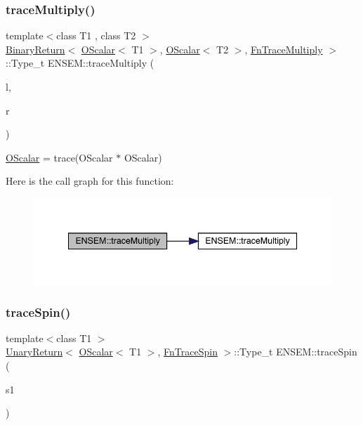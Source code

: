 \subsubsection{\texorpdfstring{traceMultiply()}{traceMultiply()}}
{\footnotesize\ttfamily template$<$class T1 , class T2 $>$ \\
\mbox{\hyperlink{structENSEM_1_1BinaryReturn}{Binary\+Return}}$<$ \mbox{\hyperlink{classENSEM_1_1OScalar}{O\+Scalar}}$<$ T1 $>$, \mbox{\hyperlink{classENSEM_1_1OScalar}{O\+Scalar}}$<$ T2 $>$, \mbox{\hyperlink{structENSEM_1_1FnTraceMultiply}{Fn\+Trace\+Multiply}} $>$\+::Type\+\_\+t E\+N\+S\+E\+M\+::trace\+Multiply (\begin{DoxyParamCaption}\item[{const \mbox{\hyperlink{classENSEM_1_1OScalar}{O\+Scalar}}$<$ T1 $>$ \&}]{l,  }\item[{const \mbox{\hyperlink{classENSEM_1_1OScalar}{O\+Scalar}}$<$ T2 $>$ \&}]{r }\end{DoxyParamCaption})\hspace{0.3cm}{\ttfamily [inline]}}



\mbox{\hyperlink{classENSEM_1_1OScalar}{O\+Scalar}} = trace(\+O\+Scalar $\ast$ O\+Scalar) 

Here is the call graph for this function\+:\nopagebreak
\begin{figure}[H]
\begin{center}
\leavevmode
\includegraphics[width=342pt]{d1/d71/group__obsscalar_ga5b8fcde5132f05c1632c08d0e22c04a7_cgraph}
\end{center}
\end{figure}
\mbox{\label{group__obsscalar_gaec323bb3e795f6f48bd41e629e4c38ab}} 
\subsubsection{\texorpdfstring{traceSpin()}{traceSpin()}}
{\footnotesize\ttfamily template$<$class T1 $>$ \\
\mbox{\hyperlink{structENSEM_1_1UnaryReturn}{Unary\+Return}}$<$ \mbox{\hyperlink{classENSEM_1_1OScalar}{O\+Scalar}}$<$ T1 $>$, \mbox{\hyperlink{structENSEM_1_1FnTraceSpin}{Fn\+Trace\+Spin}} $>$\+::Type\+\_\+t E\+N\+S\+E\+M\+::trace\+Spin (\begin{DoxyParamCaption}\item[{const \mbox{\hyperlink{classENSEM_1_1OScalar}{O\+Scalar}}$<$ T1 $>$ \&}]{s1 }\end{DoxyParamCaption})\hspace{0.3cm}{\ttfamily [inline]}}



